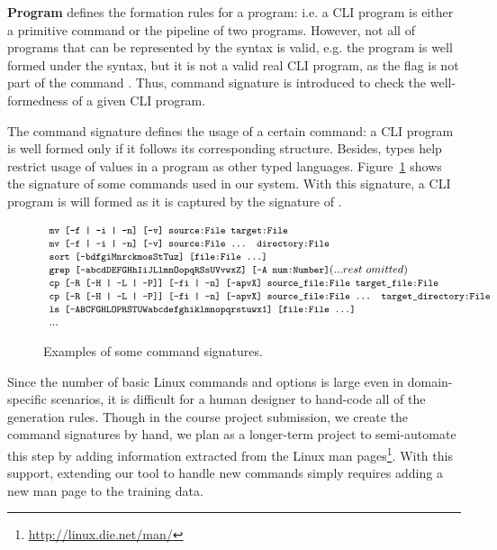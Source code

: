 \textbf{Program} defines the formation rules for a program: i.e. a CLI program is either a primitive command or the pipeline of two programs. However, not all of programs that can be represented by the syntax is valid, e.g. the program  is well formed under the syntax, but it is not a valid real CLI program, as the  flag is not part of the command . Thus, command signature is introduced to check the well-formedness of a given CLI program. 

The command signature defines the usage of a certain command: a CLI program is well formed only if it follows its corresponding structure. Besides, types help restrict usage of values in a program as other typed languages. Figure~\ref{fig:cmdsig} shows the signature of some commands used in our system. With this signature, a CLI program  is will formed as it is captured by the signature of .

\begin{figure}[ht]
\[
\begin{array}{l}

\code{mv [-f | -i | -n] [-v] source:File target:File}\\
\code{mv [-f | -i | -n] [-v] source:File ... directory:File}\\
\code{sort [-bdfgiMnrckmosStTuz] [file:File ...]}\\
\code{grep [-abcdDEFGHhIiJLlmnOopqRSsUVvwxZ] [-A num:Number]} (... rest~omitted)\\
\code{cp [-R [-H | -L | -P]] [-fi | -n] [-apvX] source\_file:File target\_file:File}\\
\code{cp [-R [-H | -L | -P]] [-fi | -n] [-apvX] source\_file:File ... target\_directory:File}\\
\code{ls [-ABCFGHLOPRSTUW\@abcdefghiklmnopqrstuwx1] [file:File ...]}\\
...
\end{array}
\]
\vspace{-15pt}
\caption{Examples of some command signatures.}
\label{fig:cmdsig}
\end{figure}

Since the number of basic Linux commands and options is large even in domain-specific scenarios, it is difficult for a human designer to hand-code all of the generation rules. Though in the course project submission, we create the command signatures by hand, we plan as a longer-term project to semi-automate this step by adding information extracted from the Linux man pages\footnote{\url{http://linux.die.net/man/}}. With this support, extending our tool to handle new commands simply requires adding a new man page to the training data.